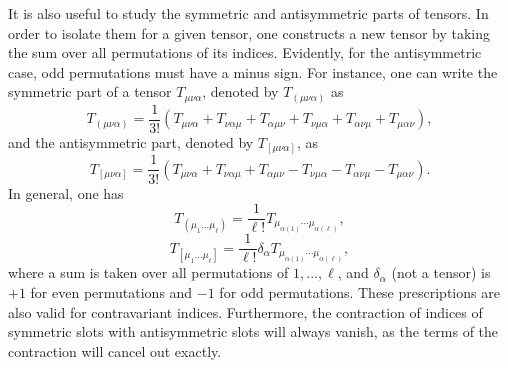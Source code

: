 \documentclass[
12pt,		%
openright,	%
twoside,  %
a4paper,			%
chapter=TITLE,		%
english,			%
french,				%
spanish,			%
brazil				%
]{USPSC-classe/USPSC}
\begin{document}
\begin{apendicesenv}
It is also useful to study the symmetric and antisymmetric parts of tensors. In order to isolate them for a given tensor, one constructs a new tensor by taking the sum over all permutations of its indices. Evidently, for the antisymmetric case, odd permutations must have a minus sign. For instance, one can write the symmetric part of a tensor $T_{\mu\nu\alpha}$, denoted by $T_{(\mu\nu\alpha)}$ as
\begin{equation}
    T_{(\mu\nu\alpha)}=\frac{1}{3!}(T_{\mu\nu\alpha}+T_{\nu\alpha\mu}+T_{\alpha\mu\nu}+T_{\nu\mu\alpha}+T_{\alpha\nu\mu}+T_{\mu\alpha\nu}),
\end{equation}
and the antisymmetric part, denoted by $T_{[\mu\nu\alpha]}$, as
\begin{equation}
    T_{[\mu\nu\alpha]}=\frac{1}{3!}(T_{\mu\nu\alpha}+T_{\nu\alpha\mu}+T_{\alpha\mu\nu}-T_{\nu\mu\alpha}-T_{\alpha\nu\mu}-T_{\mu\alpha\nu}).
\end{equation}
In general, one has
\begin{equation}\label{symmetric}
    T_{(\mu_{1}...\mu_{\ell})}=\frac{1}{\ell!}T_{\mu_{\alpha(1)}\cdots\mu_{\alpha(\ell)}},
\end{equation}
\begin{equation}\label{antisymmetric}
    T_{[\mu_{1}...\mu_{\ell}]}=\frac{1}{\ell!}\delta_{\alpha}T_{\mu_{\alpha(1)}\cdots\mu_{\alpha(\ell)}},
\end{equation}
where a sum is taken over all permutations of $1,...,\ell$, and $\delta_{\alpha}$ (not a tensor) is $+1$ for even permutations and $-1$ for odd permutations. These prescriptions are also valid for contravariant indices. Furthermore, the contraction of indices of symmetric slots with antisymmetric slots will always vanish, as the terms of the contraction will cancel out exactly.


\end{apendicesenv}
\end{document}
